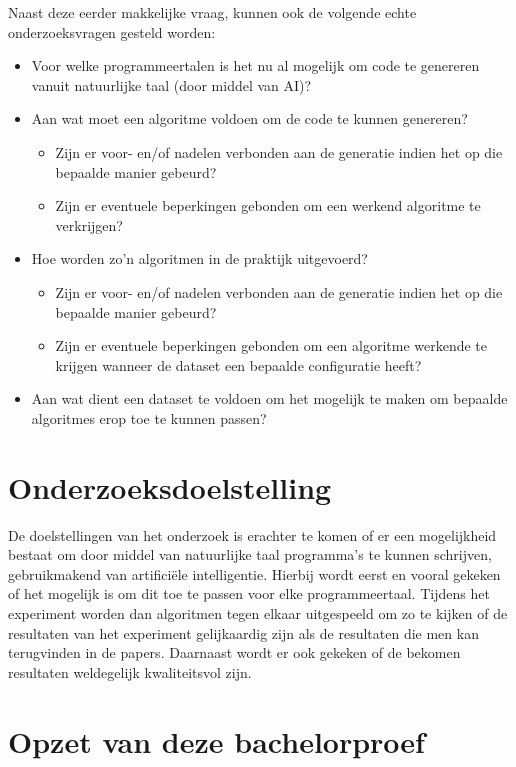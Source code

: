 Naast deze eerder makkelijke vraag, kunnen ook de volgende echte onderzoeksvragen gesteld worden:
\begin{itemize}
	\item Voor welke programmeertalen is het nu al mogelijk om code te genereren vanuit natuurlijke taal (door middel van AI)?
	\item Aan wat moet een algoritme voldoen om de code te kunnen genereren?
	\begin{itemize}
		\item Zijn er voor- en/of nadelen verbonden aan de generatie indien het op die bepaalde manier gebeurd?
		\item Zijn er eventuele beperkingen gebonden om een werkend algoritme te verkrijgen?
	\end{itemize}
	\item Hoe worden zo'n algoritmen in de praktijk uitgevoerd?
	\begin{itemize}
		\item Zijn er voor- en/of nadelen verbonden aan de generatie indien het op die bepaalde manier gebeurd?
		\item Zijn er eventuele beperkingen gebonden om een algoritme werkende te krijgen wanneer de dataset een bepaalde configuratie heeft?
	\end{itemize}
	\item Aan wat dient een dataset te voldoen om het mogelijk te maken om bepaalde algoritmes erop toe te kunnen passen?
\end{itemize}

\section{Onderzoeksdoelstelling}
\label{sec:onderzoeksdoelstelling}

De doelstellingen van het onderzoek is erachter te komen of er een mogelijkheid bestaat om door middel van natuurlijke taal programma's te kunnen schrijven, gebruikmakend van artificiële intelligentie. Hierbij wordt eerst en vooral gekeken of het mogelijk is om dit toe te passen voor elke programmeertaal. Tijdens het experiment worden dan algoritmen tegen elkaar uitgespeeld om zo te kijken of de resultaten van het experiment gelijkaardig zijn als de resultaten die men kan terugvinden in de papers. Daarnaast wordt er ook gekeken of de bekomen resultaten weldegelijk kwaliteitsvol zijn. 

\section{Opzet van deze bachelorproef}
\label{sec:opzet-bachelorproef}

